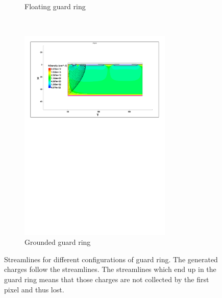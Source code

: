 \begin{figure}[htbp]
\begin{subfigure}[b]{\textwidth}
    \caption{Floating guard ring}
  \end{subfigure}\\
  \begin{subfigure}[b]{\textwidth}
    \includegraphics[width=0.8\textwidth]{figures/ActiveEdge/streamlines_GNDGR.pdf}
    \caption{Grounded guard ring}
  \end{subfigure}
  \caption{Streamlines for different configurations of guard ring. The
    generated charges follow the streamlines. The streamlines which
    end up in the guard ring means that those charges are not
    collected by the first pixel and thus lost.}
  \label{fig:TCAD_streamlines}
\end{figure}



